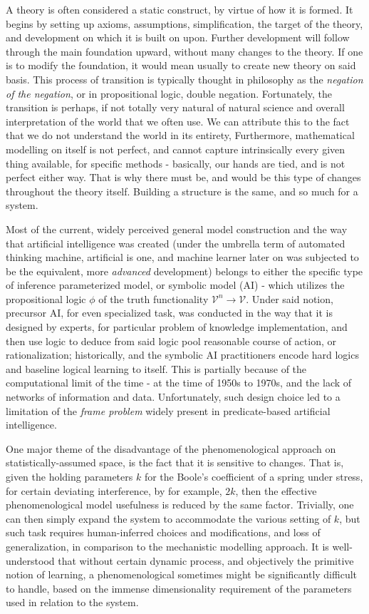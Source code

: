 A theory is often considered a static construct, by virtue of how it is formed. It begins by setting up axioms, assumptions, simplification, the target of the theory, and development on which it is built on upon. Further development will follow through the main foundation upward, without many changes to the theory. If one is to modify the foundation, it would mean usually to create new theory on said basis. This process of transition is typically thought in philosophy as the \textit{negation of the negation}, or in propositional logic, double negation. Fortunately, the transition is perhaps, if not totally very natural of natural science and overall interpretation of the world that we often use. We can attribute this to the fact that we do not understand the world in its entirety, Furthermore, mathematical modelling on itself is not perfect, and cannot capture intrinsically every given thing available, for specific methods - basically, our hands are tied, and is not perfect either way. That is why there must be, and would be this type of changes throughout the theory itself. Building a structure is the same, and so much for a system. 

Most of the current, widely perceived general model construction and the way that artificial intelligence was created (under the umbrella term of automated thinking machine, artificial is one, and machine learner later on was subjected to be the equivalent, more \textit{advanced} development) belongs to either the specific type of inference parameterized model, or symbolic model (AI) - which utilizes the propositional logic $\phi$ of the truth functionality $\mathcal{V}^{n}\to \mathcal{V}$. Under said notion, precursor AI, for even specialized task, was conducted in the way that it is designed by experts, for particular problem of knowledge implementation, and then use logic to deduce from said logic pool reasonable course of action, or rationalization; historically, \cite{minsky_papert_1969} and the symbolic AI practitioners encode hard logics and baseline logical learning to itself. This is partially because of the computational limit of the time - at the time of 1950s to 1970s, and the lack of networks of information and data. Unfortunately, such design choice led to a limitation of the \textit{frame problem} widely present in predicate-based artificial intelligence. 

One major theme of the disadvantage of the phenomenological approach on statistically-assumed space, is the fact that it is sensitive to changes. That is, given the holding parameters $k$ for the Boole's coefficient of a spring under stress, for certain deviating interference, by for example, $2k$, then the effective phenomenological model usefulness is reduced by the same factor. Trivially, one can then simply expand the system to accommodate the various setting of $k$, but such task requires human-inferred choices and modifications, and loss of generalization, in comparison to the mechanistic modelling approach. It is well-understood that without certain dynamic process, and objectively the primitive notion of learning, a phenomenological sometimes might be significantly difficult to handle, based on the immense dimensionality requirement of the parameters used in relation to the system.

